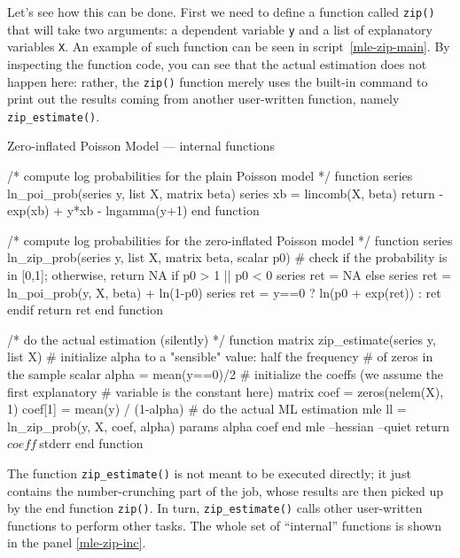 Let's see how this can be done.  First we need to define a function
called \texttt{zip()} that will take two arguments: a dependent
variable \texttt{y} and a list of explanatory variables \texttt{X}. An
example of such function can be seen in script~\ref{mle-zip-main}. By
inspecting the function code, you can see that the actual estimation
does not happen here: rather, the \texttt{zip()} function merely
uses the built-in  command to print out the results
coming from another user-written function, namely
\texttt{zip\_estimate()}.

\begin{script}[htbp]
  \caption{Zero-inflated Poisson Model --- internal functions}
  \label{mle-zip-inc}
\begin{scode}
/* compute log probabilities for the plain Poisson model */
function series ln_poi_prob(series y, list X, matrix beta)
    series xb = lincomb(X, beta)
    return -exp(xb) + y*xb - lngamma(y+1)
end function  

/* compute log probabilities for the zero-inflated Poisson model */
function series ln_zip_prob(series y, list X, matrix beta, scalar p0)
    # check if the probability is in [0,1]; otherwise, return NA
    if p0 > 1 || p0 < 0
        series ret = NA
    else
        series ret = ln_poi_prob(y, X, beta) + ln(1-p0)
        series ret = y==0 ? ln(p0 + exp(ret)) : ret
    endif
    return ret
end function  

/* do the actual estimation (silently) */
function matrix zip_estimate(series y, list X)
    # initialize alpha to a "sensible" value: half the frequency
    # of zeros in the sample
    scalar alpha = mean(y==0)/2
    # initialize the coeffs (we assume the first explanatory 
    # variable is the constant here)
    matrix coef = zeros(nelem(X), 1)
    coef[1] = mean(y) / (1-alpha)
    # do the actual ML estimation
    mle ll = ln_zip_prob(y, X, coef, alpha)
        params alpha coef
    end mle --hessian --quiet
    return $coeff ~ $stderr
end function
\end{scode}
\end{script}

The function \texttt{zip\_estimate()} is not meant to be executed
directly; it just contains the number-crunching part of the job, whose
results are then picked up by the end function \texttt{zip()}. In
turn, \texttt{zip\_estimate()} calls other user-written functions to
perform other tasks. The whole set of ``internal'' functions is shown
in the panel \ref{mle-zip-inc}.

